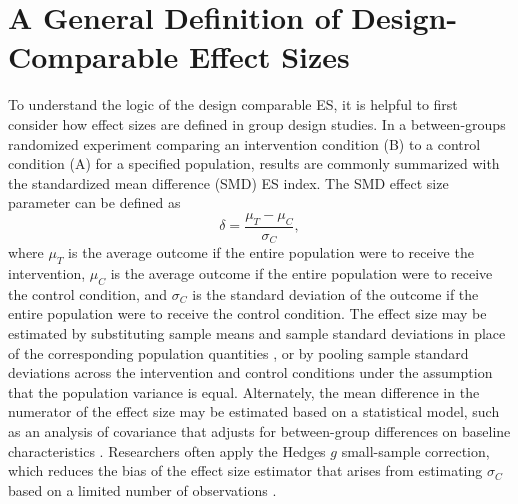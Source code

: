\documentclass[
]{book}
\begin{document}
\hypertarget{a-general-definition-of-design-comparable-effect-sizes}{%
\section{A General Definition of Design-Comparable Effect Sizes}\label{a-general-definition-of-design-comparable-effect-sizes}}

To understand the logic of the design comparable ES, it is helpful to first consider how effect sizes are defined in group design studies. In a between-groups randomized experiment comparing an intervention condition (B) to a control condition (A) for a specified population, results are commonly summarized with the standardized mean difference (SMD) ES index. The SMD effect size parameter can be defined as
\begin{equation}
\label{eq:SMD-group}
\delta = \frac{\mu_T - \mu_C}{\sigma_C},
\end{equation}
where \(\mu_T\) is the average outcome if the entire population were to receive the intervention, \(\mu_C\) is the average outcome if the entire population were to receive the control condition, and \(\sigma_C\) is the standard deviation of the outcome if the entire population were to receive the control condition. The effect size may be estimated by substituting sample means and sample standard deviations in place of the corresponding population quantities \citep{Borenstein2009effect}, or by pooling sample standard deviations across the intervention and control conditions under the assumption that the population variance is equal. Alternately, the mean difference in the numerator of the effect size may be estimated based on a statistical model, such as an analysis of covariance that adjusts for between-group differences on baseline characteristics \citep{taylor2022Promoting}. Researchers often apply the Hedges \(g\) small-sample correction, which reduces the bias of the effect size estimator that arises from estimating \(\sigma_C\) based on a limited number of observations \citep{Hedges1981distribution}.
\end{document}
